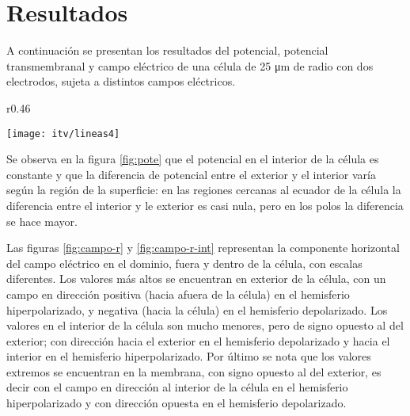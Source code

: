 
\newpage

\section{Resultados}
A continuación se presentan los resultados del potencial, potencial transmembranal y campo eléctrico de una célula de 25 \si{\micro\metre} de radio con dos electrodos, sujeta a distintos campos eléctricos.



\begin{wrapfigure}{r}{0.46\textwidth}
  \begin{center}
    \texttt{[image: itv/lineas4]}
  \end{center}
  \caption{Potencial eléctrico en el dominio\\ para E = 1600 \si{\volt\per\centi\metre}}
  \label{fig:pote}
\end{wrapfigure}

Se observa en la figura \ref{fig:pote} que el potencial en el interior de la célula es constante y que la diferencia de potencial entre el exterior y el interior varía según la región de la superficie: en las regiones cercanas al ecuador de la célula la diferencia entre el interior y le exterior es casi nula, pero en los polos la diferencia se hace mayor. 

Las figuras \ref{fig:campo-r} y \ref{fig:campo-r-int} representan la componente horizontal del campo eléctrico en el dominio, fuera y dentro de la célula, con escalas diferentes. Los valores más altos se encuentran en exterior de la célula, con un campo en dirección positiva (hacia afuera de la célula) en el hemisferio hiperpolarizado, y negativa (hacia la célula) en el hemisferio depolarizado. Los valores en el interior de la célula son mucho menores, pero de signo opuesto al del exterior; con dirección hacia el exterior en el hemisferio depolarizado y hacia el interior en el hemisferio hiperpolarizado. Por último se nota que los valores extremos se encuentran en la membrana, con signo opuesto al del exterior, es decir con el campo en dirección al interior de la célula en el hemisferio hiperpolarizado y con dirección opuesta en el hemisferio depolarizado.

